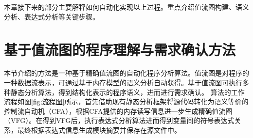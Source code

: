 %

本章接下来的部分主要解释如何自动化实现以上过程。重点介绍值流图构建、语义分析、表达式分析等关键步骤。

\section{基于值流图的程序理解与需求确认方法}

本节介绍的方法是一种基于精确值流图的自动化程序分析算法。值流图是对程序的一种数据流表示，可通过基于内存模型的语义分析自动获得。基于值流图可执行多种静态分析算法，得到结构化表示的程序语义，进而进行需求确认。
算法的工作流程如图\ref{fig:流程图}所示，首先借助现有静态分析框架将源代码转化为语义等价的控制流自动机（CFA），根据CFA提供的内存读写信息进一步生成精确值流图（VFG）。在得到VFG后，执行表达式分析算法进而得到变量间的符号表达式关系，最终根据表达式信息生成模块摘要并保存在源文件中。

